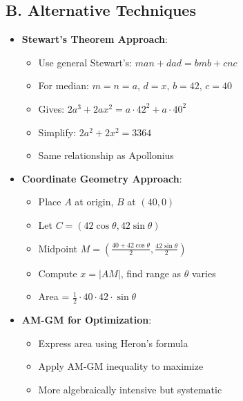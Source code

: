 \documentclass[12pt]{article}
\begin{document}
\begin{techniquesbox}
\subsection*{B. Alternative Techniques}
\begin{itemize}[leftmargin=*]
    \item \textbf{Stewart's Theorem Approach}:
    \begin{itemize}
        \item Use general Stewart's: $man + dad = bmb + cnc$
        \item For median: $m = n = a$, $d = x$, $b = 42$, $c = 40$
        \item Gives: $2a^3 + 2ax^2 = a \cdot 42^2 + a \cdot 40^2$
        \item Simplify: $2a^2 + 2x^2 = 3364$
        \item Same relationship as Apollonius
    \end{itemize}
    
    \item \textbf{Coordinate Geometry Approach}:
    \begin{itemize}
        \item Place $A$ at origin, $B$ at $(40, 0)$
        \item Let $C = (42\cos\theta, 42\sin\theta)$
        \item Midpoint $M = \left(\frac{40 + 42\cos\theta}{2}, \frac{42\sin\theta}{2}\right)$
        \item Compute $x = |AM|$, find range as $\theta$ varies
        \item Area = $\frac{1}{2} \cdot 40 \cdot 42 \cdot \sin\theta$
    \end{itemize}
    
    \item \textbf{AM-GM for Optimization}:
    \begin{itemize}
        \item Express area using Heron's formula
        \item Apply AM-GM inequality to maximize
        \item More algebraically intensive but systematic
    \end{itemize}
\end{itemize}
\end{techniquesbox}
\end{document}
